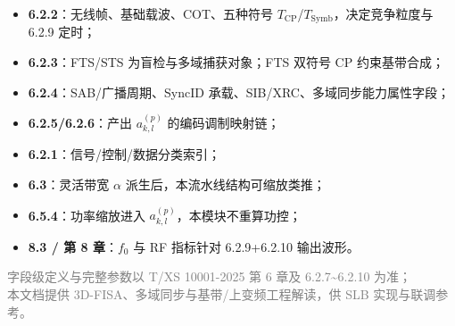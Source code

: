 \documentclass[11pt,a4paper]{ctexart}
\begin{document}
\begin{itemize}[nosep]
  \item \textbf{6.2.2}：无线帧、基础载波、COT、五种符号 $T_{\mathrm{CP}}$/$T_{\mathrm{Symb}}$，决定竞争粒度与 6.2.9 定时；
  \item \textbf{6.2.3}：FTS/STS 为盲检与多域捕获对象；FTS 双符号 CP 约束基带合成；
  \item \textbf{6.2.4}：SAB/广播周期、SyncID 承载、SIB/XRC、多域同步能力属性字段；
  \item \textbf{6.2.5/6.2.6}：产出 $a_{k,l}^{(p)}$ 的编码调制映射链；
  \item \textbf{6.2.1}：信号/控制/数据分类索引；
  \item \textbf{6.3}：灵活带宽 $\alpha$ 派生后，本流水线结构可缩放类推；
  \item \textbf{6.5.4}：功率缩放进入 $a_{k,l}^{(p)}$，本模块不重算功控；
  \item \textbf{8.3 / 第 8 章}：$f_0$ 与 RF 指标针对 6.2.9+6.2.10 输出波形。
\end{itemize}

\vfill
\begin{center}
\small\textcolor{gray}{字段级定义与完整参数以 T/XS 10001-2025 第 6 章及 6.2.7\textasciitilde 6.2.10 为准；\\
本文档提供 3D-FISA、多域同步与基带/上变频工程解读，供 SLB 实现与联调参考。}
\end{center}
\end{document}
